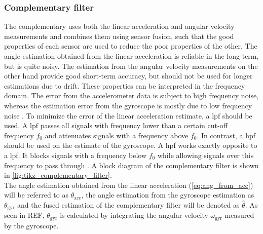 \subsubsection{Complementary filter}
The complementary uses both the linear acceleration and angular velocity measurements and combines them using sensor fusion, such that the good properties of each sensor are used to reduce the poor properties of the other.
The angle estimation obtained from the linear acceleration is reliable in the long-term, but is quite noisy.
The estimation from the angular velocity measurements on the other hand provide good short-term accuracy, but should not be used for longer estimations due to drift.
These properties can be interpreted in the frequency domain.
The error from the accelerometer data is subject to high frequency noise, whereas the estimation error from the gyroscope is mostly due to low frequency noise \cite{2007Colton}.
To minimize the error of the linear acceleration estimate, a \gls{lpf} should be used.
A \gls{lpf} passes all signals with frequency lower than a certain cut-off frequency $f_0$ and attenuates signals with a frequency above $f_0$.
In contrast, a \gls{hpf} should be used on the estimate of the gyroscope.
A \gls{hpf} works exactly opposite to a \gls{lpf}.
It blocks signals with a frequency below $f_0$ while allowing signals over this frequency to pass through \cite{Lyons1996}. A block diagram of the complementary filter is shown in \cref{fig:tikz_complementary_filter}.\\
The angle estimation obtained from the linear acceleration (\cref{eq:ang_from_acc}) will be referred to as $\theta_\mathrm{acc}$, the angle estimation from the gyroscope estimation as $\theta_\mathrm{gyr}$ and the fused estimation of the complementary filter will be denoted as $\hat{\theta}$.
As seen in REF, $\theta_\mathrm{gyr}$ is calculated by integrating the angular velocity $\omega_\mathrm{gyr} $ measured by the gyroscope.
